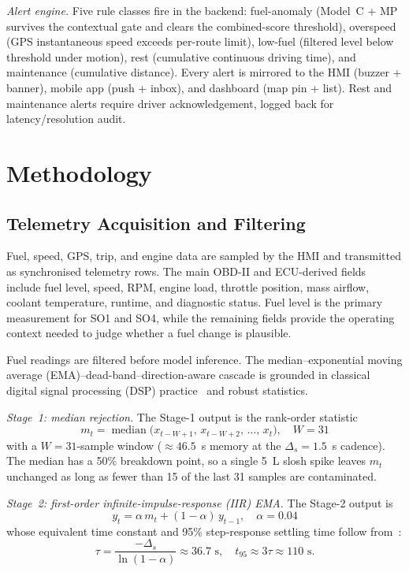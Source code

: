 \documentclass[10pt,journal]{IEEEtran}
\begin{document}
\emph{Alert engine.} Five rule classes fire in the backend: fuel-anomaly (Model~C + MP survives the contextual gate and clears the combined-score threshold), overspeed (GPS instantaneous speed exceeds per-route limit), low-fuel (filtered level below threshold under motion), rest (cumulative continuous driving time), and maintenance (cumulative distance). Every alert is mirrored to the HMI (buzzer + banner), mobile app (push + inbox), and dashboard (map pin + list). Rest and maintenance alerts require driver acknowledgement, logged back for latency/resolution audit.

\section{Methodology}
\subsection{Telemetry Acquisition and Filtering}
Fuel, speed, GPS, trip, and engine data are sampled by the HMI and transmitted as synchronised telemetry rows. The main OBD-II and ECU-derived fields include fuel level, speed, RPM, engine load, throttle position, mass airflow, coolant temperature, runtime, and diagnostic status. Fuel level is the primary measurement for SO1 and SO4, while the remaining fields provide the operating context needed to judge whether a fuel change is plausible.

Fuel readings are filtered before model inference. The median--exponential moving average (EMA)--dead-band--direction-aware cascade is grounded in classical digital signal processing (DSP) practice~\cite{oppenheim2010dsp} and robust statistics.


\emph{Stage~1: median rejection.} The Stage-1 output is the rank-order statistic
\begin{equation}
m_t = \operatorname{median}\bigl(x_{t-W+1},\, x_{t-W+2},\, \ldots,\, x_t\bigr),\quad W = 31
\label{eq:art-median}
\end{equation}
with a $W = 31$-sample window ($\approx 46.5$~s memory at the $\Delta_s = 1.5$~s cadence). The median has a 50\% breakdown point, so a single 5~L slosh spike leaves $m_t$ unchanged as long as fewer than 15 of the last 31 samples are contaminated.

\emph{Stage~2: first-order infinite-impulse-response (IIR) EMA.} The Stage-2 output is
\begin{equation}
y_t = \alpha\, m_t + (1 - \alpha)\, y_{t-1},\quad \alpha = 0.04
\label{eq:art-ema}
\end{equation}
whose equivalent time constant and 95\% step-response settling time follow from~\cite{oppenheim2010dsp}:
\begin{equation}
\tau = \frac{-\Delta_s}{\ln(1-\alpha)} \approx 36.7\text{ s},\quad t_{95} \approx 3\tau \approx 110\text{ s}.
\label{eq:art-ema-time-constant}
\end{equation}
\end{document}
